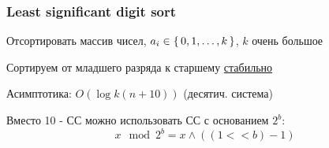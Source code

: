 \subsubsection{Least significant digit sort}

\begin{task}
Отсортировать массив чисел, $a_i \in \set{0, 1, \ldots, k}$, $k$ очень большое
\end{task}
\begin{solution}
Сортируем от младшего разряда к старшему \underline{стабильно}

Асимптотика: $O(\log k (n + 10))$ (десятич. система)

Вместо 10 - СС можно использовать СС с основанием $2^{b}$:
\[
  x \mod 2^{b} = x \land ((1 << b) - 1)
\] 
\end{solution}
